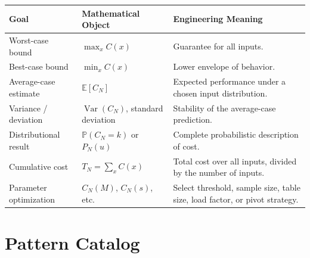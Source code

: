 \documentclass[11pt]{article}
\newcommand{\E}{\mathbb{E}}
\newcommand{\Var}{\operatorname{Var}}
\newcommand{\Prob}{\mathbb{P}}
\begin{document}
\begin{center}
\begin{tabularx}{\textwidth}{L{0.24\textwidth} L{0.27\textwidth} Y}
\toprule
\textbf{Goal} & \textbf{Mathematical Object} & \textbf{Engineering Meaning} \\
\midrule
Worst-case bound & \(\max_x C(x)\) & Guarantee for all inputs. \\
Best-case bound & \(\min_x C(x)\) & Lower envelope of behavior. \\
Average-case estimate & \(\E[C_N]\) & Expected performance under a chosen input distribution. \\
Variance / deviation & \(\Var(C_N)\), standard deviation & Stability of the average-case prediction. \\
Distributional result & \(\Prob(C_N=k)\) or \(P_N(u)\) & Complete probabilistic description of cost. \\
Cumulative cost & \(T_N = \sum_x C(x)\) & Total cost over all inputs, divided by the number of inputs. \\
Parameter optimization & \(C_N(M)\), \(C_N(s)\), etc. & Select threshold, sample size, table size, load factor, or pivot strategy. \\
\bottomrule
\end{tabularx}
\end{center}

\section{Pattern Catalog}
\end{document}
